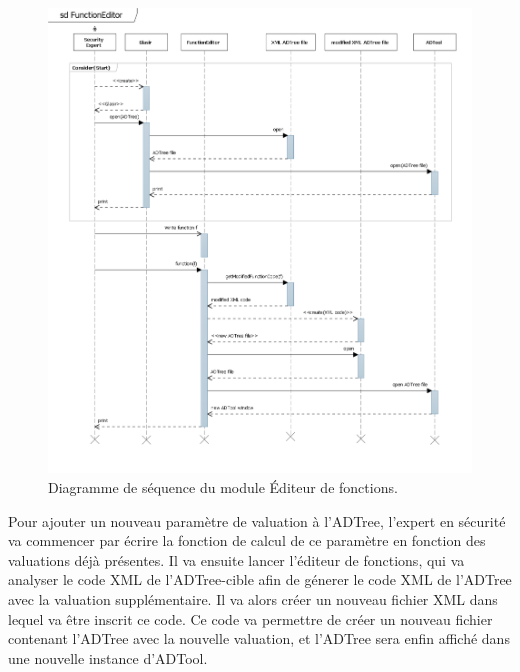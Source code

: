 	    \begin{figure}[H]
	        \centering
	        \includegraphics[height=1\textwidth]{figure/FunctionEditor.png}
	        \caption{Diagramme de séquence du module Éditeur de fonctions.}
	        \label{fig:function}
	    \end{figure}

Pour ajouter un nouveau paramètre de valuation à l'ADTree, l'expert en sécurité va commencer par écrire la fonction de calcul de ce paramètre en fonction des valuations déjà présentes. Il va ensuite lancer l'éditeur de fonctions, qui va analyser le code XML de l'ADTree-cible afin de génerer le code XML de l'ADTree avec la valuation supplémentaire. Il va alors créer un nouveau fichier XML dans lequel va être inscrit ce code. Ce code va permettre de créer un nouveau fichier contenant l'ADTree avec la nouvelle valuation, et l'ADTree sera enfin affiché dans une nouvelle instance d'ADTool.
